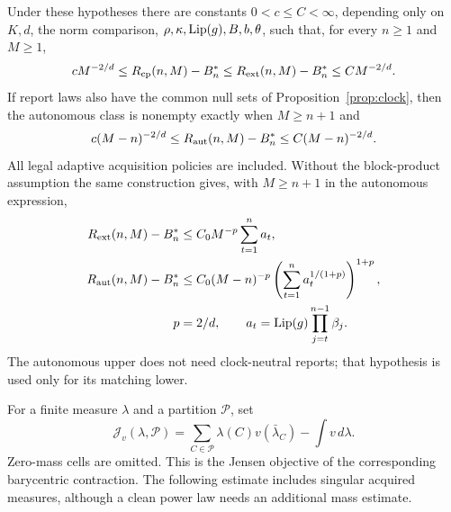 \begin{theorem}\label{thm:regular}
Under these hypotheses there are constants $0<c\le C<\infty$, depending only on $K,d$, the norm comparison, $\rho,\kappa,\operatorname{Lip}(g),B,b,\theta$, such that, for every $n\ge1$ and $M\ge1$,
\begin{equation}\label{eq:regular_ext}
 cM^{-2/d}\le R_{\mathrm{cp}}(n,M)-B_n^*
 \le R_{\mathrm{ext}}(n,M)-B_n^*\le CM^{-2/d}.
\end{equation}
If report laws also have the common null sets of Proposition~\ref{prop:clock}, then the autonomous class is nonempty exactly when $M\ge n+1$ and
\begin{equation}\label{eq:regular_aut}
 c(M-n)^{-2/d}\le R_{\mathrm{aut}}(n,M)-B_n^*
 \le C(M-n)^{-2/d}.
\end{equation}
All legal adaptive acquisition policies are included. Without the block-product assumption the same construction gives, with $M\ge n+1$ in the autonomous expression,
\begin{align}\label{eq:weighted_upper}
 R_{\mathrm{ext}}(n,M)-B_n^*&\le C_0M^{-p}\sum_{t=1}^n a_t,\\
 R_{\mathrm{aut}}(n,M)-B_n^*&\le C_0(M-n)^{-p}
         \left(\sum_{t=1}^n a_t^{1/(1+p)}\right)^{1+p},\notag\\
 p&=2/d,\qquad a_t=\operatorname{Lip}(g)\prod_{j=t}^{n-1}\beta_j.\notag
\end{align}
The autonomous upper does not need clock-neutral reports; that hypothesis is used only for its matching lower.
\end{theorem}
For a finite measure $\lambda$ and a partition $\mathcal P$, set
\[
 \mathcal J_v(\lambda,\mathcal P)=\sum_{C\in\mathcal P}
 \lambda(C)v(\bar\lambda_C)-\int v\,d\lambda.
\]
Zero-mass cells are omitted. This is the Jensen objective of the corresponding barycentric contraction. The following estimate includes singular acquired measures, although a clean power law needs an additional mass estimate.

